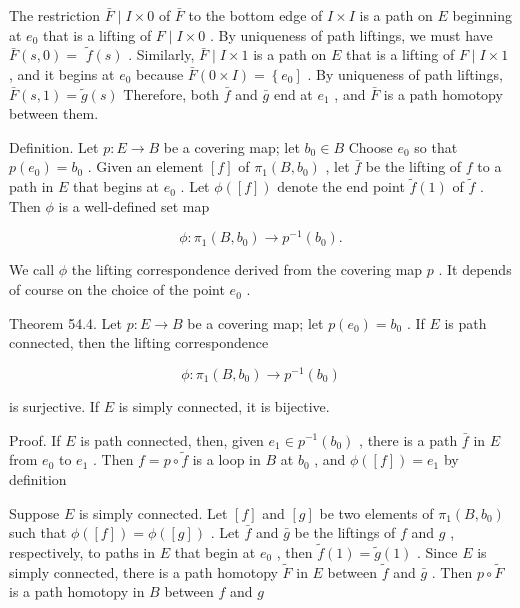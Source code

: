 The restriction \(\bar{F} \mid  I \times  0\) of \(\bar{F}\) to the bottom edge of \(I \times  I\) is a path on \(E\) beginning at \({e}_{0}\) that is a lifting of \(F \mid  I \times  0\) . By uniqueness of path liftings, we must have \(\bar{F}\left( {s,0}\right)  =\)  \(\widetilde{f}\left( s\right)\) . Similarly, \(\bar{F} \mid  I \times  1\) is a path on \(E\) that is a lifting of \(F \mid  I \times  1\) , and it begins at \({e}_{0}\) because \(\bar{F}\left( {0 \times  I}\right)  = \left\{  {e}_{0}\right\rbrack\) . By uniqueness of path liftings, \(\bar{F}\left( {s,1}\right)  = \widetilde{g}\left( s\right)\) Therefore, both \(\bar{f}\) and \(\bar{g}\) end at \({e}_{1}\) , and \(\bar{F}\) is a path homotopy between them.

Definition. Let \(p : E \rightarrow  B\) be a covering map; let \({b}_{0} \in  B\) Choose \({e}_{0}\) so that \(p\left( {e}_{0}\right)  = {b}_{0}\) . Given an element \(\left\lbrack  f\right\rbrack\) of \({\pi }_{1}\left( {B,{b}_{0}}\right)\) , let \(\bar{f}\) be the lifting of \(f\) to a path in \(E\) that begins at \({e}_{0}\) . Let \(\phi \left( \left\lbrack  f\right\rbrack  \right)\) denote the end point \(\widetilde{f}\left( 1\right)\) of \(\widetilde{f}\) . Then \(\phi\) is a well-defined set map

\[
\phi  : {\pi }_{1}\left( {B,{b}_{0}}\right)  \rightarrow  {p}^{-1}\left( {b}_{0}\right) .
\]

We call \(\phi\) the lifting correspondence derived from the covering map \(p\) . It depends of course on the choice of the point \({e}_{0}\) .

Theorem 54.4. Let \(p : E \rightarrow  B\) be a covering map; let \(p\left( {e}_{0}\right)  = {b}_{0}\) . If \(E\) is path connected, then the lifting correspondence

\[
\phi  : {\pi }_{1}\left( {B,{b}_{0}}\right)  \rightarrow  {p}^{-1}\left( {b}_{0}\right)
\]

is surjective. If \(E\) is simply connected, it is bijective.

Proof. If \(E\) is path connected, then, given \({e}_{1} \in  {p}^{-1}\left( {b}_{0}\right)\) , there is a path \(\bar{f}\) in \(E\) from \({e}_{0}\) to \({e}_{1}\) . Then \(f = p \circ  \widetilde{f}\) is a loop in \(B\) at \({b}_{0}\) , and \(\phi \left( \left\lbrack  f\right\rbrack  \right)  = {e}_{1}\) by definition

Suppose \(E\) is simply connected. Let \(\left\lbrack  f\right\rbrack\) and \(\left\lbrack  g\right\rbrack\) be two elements of \({\pi }_{1}\left( {B,{b}_{0}}\right)\) such that \(\phi \left( \left\lbrack  f\right\rbrack  \right)  = \phi \left( \left\lbrack  g\right\rbrack  \right)\) . Let \(\bar{f}\) and \(\bar{g}\) be the liftings of \(f\) and \(g\) , respectively, to paths in \(E\) that begin at \({e}_{0}\) , then \(\widetilde{f}\left( 1\right)  = \widetilde{g}\left( 1\right)\) . Since \(E\) is simply connected, there is a path homotopy \(\widetilde{F}\) in \(E\) between \(\widetilde{f}\) and \(\bar{g}\) . Then \(p \circ  \widetilde{F}\) is a path homotopy in \(B\) between \(f\) and \(g\)


